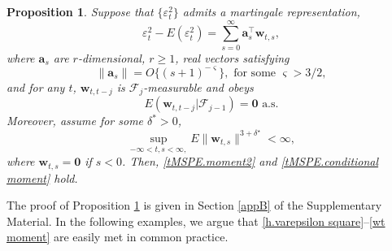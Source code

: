 \documentclass[ejsv2]{imsart}
\theoremstyle{plain}
\newtheorem{proposition}{Proposition}[section]
\theoremstyle{definition}
\theoremstyle{remark}
\begin{document}
\begin{proposition}\label{prop3.1}
Suppose that $\{\varepsilon_t^2\}$ admits a martingale representation,
\begin{equation}\label{h.varepsilon square}
\varepsilon_t^2-E(\varepsilon_t^2)=\sum_{s=0}^{\infty}\mathbf{a}^\top_s\bm{w}_{t,s},
\end{equation}
where $\mathbf{a}_s$ are $r$-dimensional, $r\geq 1$, real vectors satisfying
\begin{equation}\label{h.coefficient a}
\lVert \mathbf{a}_s\rVert=O\{(s+1)^{-\varsigma}\},\,\,\mbox{for some}\,\,\varsigma>3/2,
\end{equation}
and for any $t$,
$\bm{w}_{t,t-j}$ is
$\mathcal{F}_{j}$-measurable
and obeys
\begin{equation}\label{wt moment0}
E(\bm{w}_{t,t-j}|\mathcal{F}_{j-1})=\mathbf{0}\,\,\mbox{a.s.}
\end{equation}
Moreover, assume for some $\delta^{*}>0$, 
\begin{equation}\label{wt moment}
\sup\limits_{-\infty<t,s<\infty,}E\lVert \bm{w}_{t,s}\rVert^{3+\delta^\star}<\infty,
\end{equation}
where
$\bm{w}_{t,s}=\mathbf{0}$ if $s<0$.
Then, \eqref{tMSPE.moment2} and \eqref{tMSPE.conditional moment} hold. %
\end{proposition}

The proof of Proposition \ref{prop3.1} is given in
Section \ref{appB} of the Supplementary Material. In the following examples,
we argue that
\eqref{h.varepsilon square}--\eqref{wt moment}
are easily met in common practice.
\end{document}
